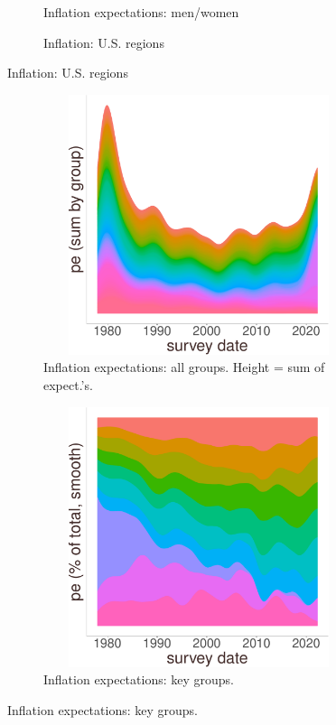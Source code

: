 \documentclass[12pt]{article}
\begin{document}
\begin{figure}
\centering
\caption{Diversity of inflation survey expectations: gender \& regions.}\label{fig:intro}
\begin{subfigure}[t]{ 0.75\textwidth}
\centering

\caption{Inflation expectations: men/women}
\end{subfigure}
\vfill
\begin{subfigure}[t]{0.75\textwidth}
\centering

\caption{Inflation: U.S. regions}\label{fig:intro:RegInf}
\end{subfigure}
\end{figure}

\begin{figure}
\centering
\caption{Diversity of inflation survey expectations: by groups}\label{fig:intro2}
\begin{subfigure}[t]{0.75\textwidth}
\includegraphics[width = 6.5in, height =3in]{figs/aggIndComp}
\caption{Inflation expectations: all groups. Height = sum of expect.'s.}\label{fig:groupExpects}
\end{subfigure}
\vfill
\begin{subfigure}[t]{0.75\textwidth}
\includegraphics[width = 6.5in, height =3in]{figs/weightsTop10comp}
\caption{Inflation expectations: key groups.}\label{fig:top10Expects}
\end{subfigure}
\end{figure}
\end{document}
